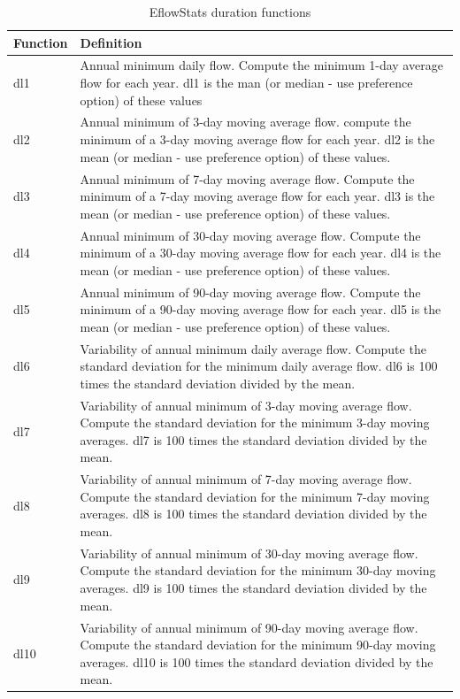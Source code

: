 \documentclass[a4paper,11pt]{article}\usepackage[]{graphicx}\usepackage[]{color}
\begin{document}
\begin{table}[ht]
  \centering
  \begin{threeparttable}[b]
  \caption{EflowStats duration functions}
  \label{tab:durStats}
\begin{tabularx}{\textwidth}{|l|X|}
  \hline
\textbf{Function} & \textbf{Definition} \\ 
  \hline
  dl1 & Annual minimum daily flow. Compute the minimum 1-day average flow for each year. dl1 is the man (or median - use preference option) of these values \\
  dl2 & Annual minimum of 3-day moving average flow. compute the minimum of a 3-day moving average flow for each year. dl2 is the mean (or median - use preference option) of these values. \\
  dl3 & Annual minimum of 7-day moving average flow. Compute the minimum of a 7-day moving average flow for each year. dl3 is the mean (or median - use preference option) of these values. \\
  dl4 & Annual minimum of 30-day moving average flow. Compute the minimum of a 30-day moving average flow for each year. dl4 is the mean (or median - use preference option) of these values. \\
  dl5 & Annual minimum of 90-day moving average flow. Compute the minimum of a 90-day moving average flow for each year. dl5 is the mean (or median - use preference option) of these values. \\
  dl6 & Variability of annual minimum daily average flow. Compute the standard deviation for the minimum daily average flow. dl6 is 100 times the standard deviation divided by the mean. \\
  dl7 & Variability of annual minimum of 3-day moving average flow. Compute the standard deviation for the minimum 3-day moving averages. dl7 is 100 times the standard deviation divided by the mean. \\
  dl8 & Variability of annual minimum of 7-day moving average flow. Compute the standard deviation for the minimum 7-day moving averages. dl8 is 100 times the standard deviation divided by the mean. \\
  dl9 & Variability of annual minimum of 30-day moving average flow. Compute the standard deviation for the minimum 30-day moving averages. dl9 is 100 times the standard deviation divided by the mean. \\
  dl10 & Variability of annual minimum of 90-day moving average flow. Compute the standard deviation for the minimum 90-day moving averages. dl10 is 100 times the standard deviation divided by the mean. \\

\end{tabularx}
\end{threeparttable}
\end{table}
\end{document}
